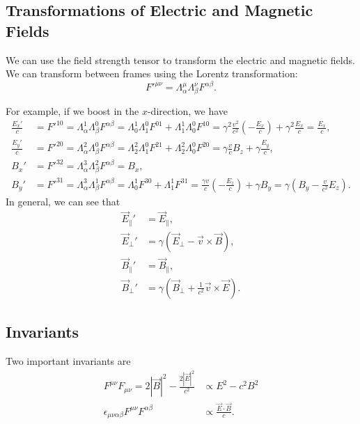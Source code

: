 \subsection{Transformations of Electric and Magnetic Fields}
We can use the field strength tensor to transform the electric and magnetic fields. We can transform between frames using the Lorentz transformation:
\[F'^{\mu \nu} = \Lambda_{\alpha}^{\mu} \Lambda_{\beta}^{\nu} F^{\alpha \beta}. \]

For example, if we boost in the $x$-direction, we have
\begin{align*}
    \frac{E_x'}{c} &= F'^{10} = \Lambda_\alpha^1 \Lambda_\beta^0 F^{\alpha \beta} = \Lambda_0^1 \Lambda_1^0 F^{01}+\Lambda_1^1 \Lambda_0^0 F^{10} = \gamma^2 \frac{v^2}{c^2} \left(-\frac{E_x}{c}\right) + \gamma^2 \frac{E_x}{c} = \frac{E_x}{c},\\
    \frac{E_y'}{c} &= F'^{20} = \Lambda_\alpha^2 \Lambda_\beta^0 F^{\alpha \beta} = \Lambda_{2}^{2} \Lambda_1^0 F^{21} + \Lambda_2^2 \Lambda_0^0 F^{20} = \gamma \frac{v}{c} B_z + \gamma \frac{E_y}{c},\\
    B_x' &= F'^{32} = \Lambda_\alpha^3 \Lambda_\beta^2 F^{\alpha \beta} = B_x,\\
    B_y' &= F'^{31} = \Lambda^3_\alpha \Lambda^1_\beta F^{\alpha \beta} = \Lambda_0^1 F^{30} +\Lambda_1^1 F^{31} = \frac{\gamma v}{c} \left(-\frac{E_z}{c}\right)+\gamma B_y = \gamma\left(B_y-\frac{v}{c^2} E_z \right).
\end{align*}
In general, we can see that 
\begin{align*}
    \vec{E}_\parallel' &= \vec{E}_\parallel,\\ \vec{E}_\perp' &= \gamma( \vec{E}_\perp-\vec{v} \times \vec{B}), \\
    \vec{B}_\parallel' &= \vec{B}_\parallel, \\
    \vec{B}_\perp' &= \gamma\left( \vec{B}_\perp+\frac{1}{c^2}\vec{v} \times \vec{E}\right).
\end{align*}
\subsection{Invariants}
Two important invariants are 
\begin{align*}
    F^{\mu\nu} F_{\mu \nu} = 2|\vec{B}|^2 - \frac{2|\vec{E}|^2}{c^2} &\propto E^2-c^2B^2 \\
    \epsilon_{\mu\nu\alpha\beta} F^{\mu\nu} F^{\alpha\beta} &\propto \frac{\vec{E}\cdot\vec{B}}{c}.
\end{align*}